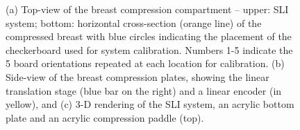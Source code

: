 \begin{figure}
	\begin{center}
	\end{center}
	\caption{ (a) Top-view of the breast compression compartment -- upper: SLI system; bottom: horizontal cross-section (orange line) of the compressed breast with blue circles indicating the placement of the checkerboard used for system calibration. Numbers 1-5 indicate the 5 board orientations repeated at each location for calibration. (b) Side-view of the breast compression plates, showing the linear translation stage (blue bar on the right) and a linear encoder (in yellow), and  (c) 3-D rendering of the SLI system, an acrylic bottom plate and an acrylic compression paddle (top). } 
	\label{fig:mammographysetup}
\end{figure} 

